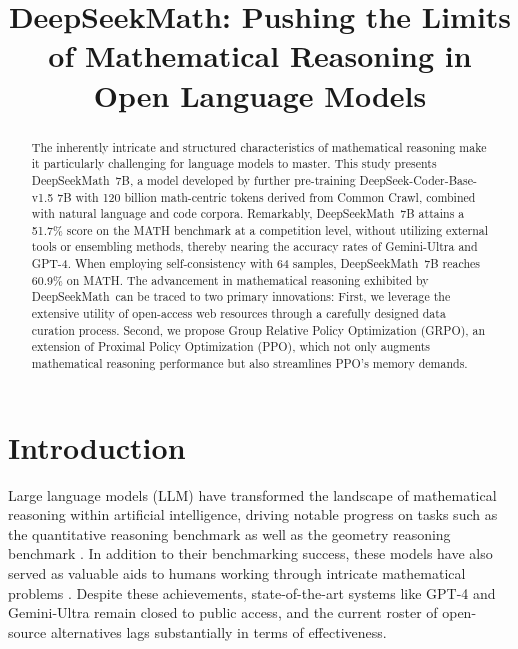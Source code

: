 \title{DeepSeekMath: Pushing the Limits of Mathematical Reasoning in Open Language Models}

\begin{abstract}
The inherently intricate and structured characteristics of mathematical reasoning make it particularly challenging for language models to master. This study presents DeepSeekMath~7B, a model developed by further pre-training DeepSeek-Coder-Base-v1.5 7B with 120 billion math-centric tokens derived from Common Crawl, combined with natural language and code corpora. Remarkably, DeepSeekMath~7B attains a 51.7\% score on the MATH benchmark at a competition level, without utilizing external tools or ensembling methods, thereby nearing the accuracy rates of Gemini-Ultra and GPT-4. When employing self-consistency with 64 samples, DeepSeekMath~7B reaches 60.9\% on MATH. The advancement in mathematical reasoning exhibited by DeepSeekMath~can be traced to two primary innovations: First, we leverage the extensive utility of open-access web resources through a carefully designed data curation process. Second, we propose Group Relative Policy Optimization (GRPO), an extension of Proximal Policy Optimization (PPO), which not only augments mathematical reasoning performance but also streamlines PPO's memory demands.
\end{abstract}

\section{Introduction}

Large language models (LLM) have transformed the landscape of mathematical reasoning within artificial intelligence, driving notable progress on tasks such as the quantitative reasoning benchmark \citep{MATH} as well as the geometry reasoning benchmark \citep{trinh2024solving}. In addition to their benchmarking success, these models have also served as valuable aids to humans working through intricate mathematical problems \citep{tao}. Despite these achievements, state-of-the-art systems like GPT-4 \citep{gpt4} and Gemini-Ultra \citep{gemini} remain closed to public access, and the current roster of open-source alternatives lags substantially in terms of effectiveness.

